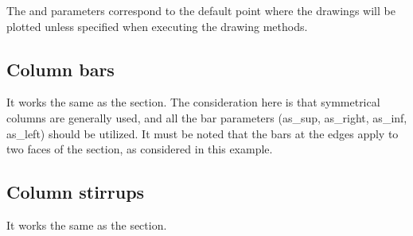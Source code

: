 \documentclass[a4paper,10pt,english]{sphinxmanual}
\begin{document}
\begin{sphinxVerbatim}[commandchars=\\\{\}]
   

  
                 
                 
                 
                 
\end{sphinxVerbatim}

\sphinxAtStartPar
The  and  parameters correspond to the default point where the drawings will be plotted unless specified when
executing the drawing methods.


\subsection{Column bars}
\label{\detokenize{usage:column-bars}}
\sphinxAtStartPar
It works the same as the {\hyperref[\detokenize{usage:beam-bars-label}]{}} section. The consideration here is that symmetrical columns are
generally used, and all the bar parameters (as\_sup, as\_right, as\_inf, as\_left) should be utilized. It must be noted that
the bars at the edges apply to two faces of the section, as considered in this example.


\subsection{Column stirrups}
\label{\detokenize{usage:column-stirrups}}
\sphinxAtStartPar
It works the same as the {\hyperref[\detokenize{usage:beam-stirrups-label}]{}} section.
\end{document}
